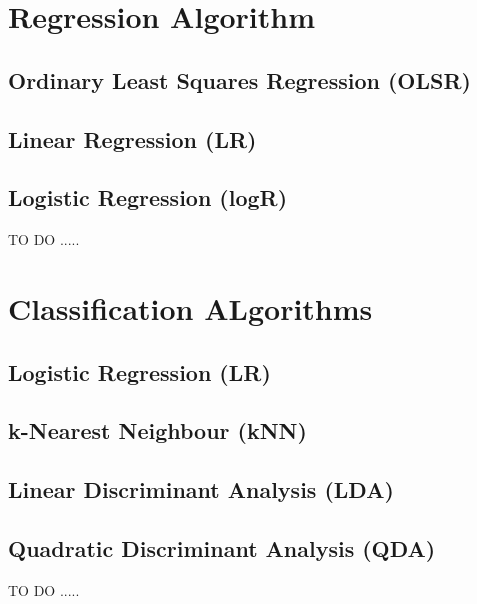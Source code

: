 \documentclass[letterpaper,11pt,english]{sphinxmanual}
\begin{document}
\chapter{Regression Algorithm}
\label{regression:regression-algorithm}\label{regression::doc}\label{regression:regression}

\section{Ordinary Least Squares Regression (OLSR)}
\label{regression:ordinary-least-squares-regression-olsr}

\section{Linear Regression (LR)}
\label{regression:linear-regression-lr}

\section{Logistic Regression (logR)}
\label{regression:logistic-regression-logr}
TO DO .....


\chapter{Classification ALgorithms}
\label{classification::doc}\label{classification:classification-algorithms}\label{classification:classification}

\section{Logistic Regression (LR)}
\label{classification:logistic-regression-lr}

\section{k-Nearest Neighbour (kNN)}
\label{classification:k-nearest-neighbour-knn}

\section{Linear Discriminant Analysis (LDA)}
\label{classification:linear-discriminant-analysis-lda}

\section{Quadratic Discriminant Analysis (QDA)}
\label{classification:quadratic-discriminant-analysis-qda}
TO DO .....
\end{document}
